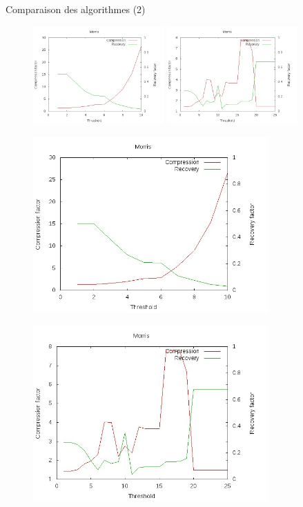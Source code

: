 \documentclass[10pt]{beamer}
\begin{document}
\begin{frame}{Comparaison des algorithmes (2)}
 {
\begin{figure}
\centering
\includegraphics[width = 5cm]{images/Morris77.jpg} \hspace{0.5cm}
\includegraphics[width = 5cm]{images/MorrisDiag.jpg}
\end{figure}}

 {
\begin{figure}
\centering
\includegraphics[width = 9cm]{images/Morris77.jpg}
\end{figure}}

 {
\begin{figure}
\centering
\includegraphics[width = 9cm]{images/MorrisDiag.jpg}
\end{figure}}
\end{frame}
\end{document}
